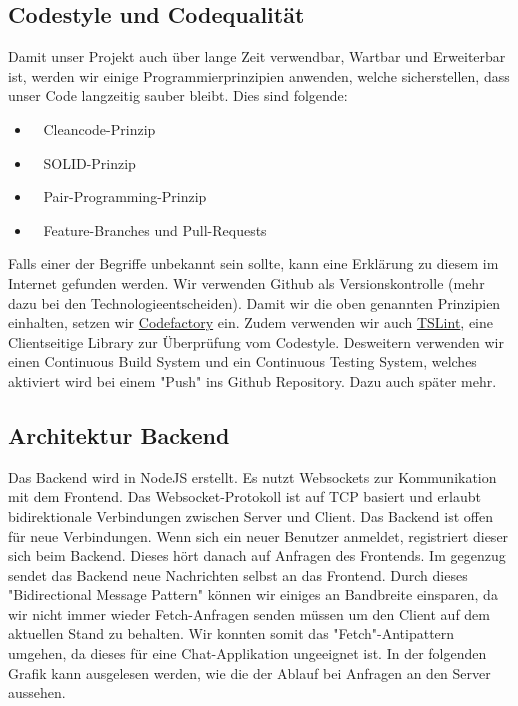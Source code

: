 	\subsection{Codestyle und Codequalität}
	Damit unser Projekt auch über lange Zeit verwendbar, Wartbar und Erweiterbar ist, werden wir einige Programmierprinzipien anwenden, welche sicherstellen, dass unser Code langzeitig sauber bleibt. Dies sind folgende:
	\begin{itemize}
		\item \faCode~ Cleancode-Prinzip
		\item \faInstitution~ SOLID-Prinzip
		\item \faUsers~ Pair-Programming-Prinzip
		\item \faGit~ Feature-Branches und Pull-Requests
	\end{itemize}
	Falls einer der Begriffe unbekannt sein sollte, kann eine Erklärung zu diesem im Internet gefunden werden.\newline
	Wir verwenden Github als Versionskontrolle (mehr dazu bei den Technologieentscheiden). Damit wir die oben genannten Prinzipien einhalten, setzen wir \href{https://www.codefactor.io}{Codefactory} ein. Zudem verwenden wir auch \href{https://palantir.github.io/tslint/}{TSLint}, eine Clientseitige Library zur Überprüfung vom Codestyle.\newline
	Desweitern verwenden wir einen Continuous Build System und ein Continuous Testing System, welches aktiviert wird bei einem "Push" ins Github Repository. Dazu auch später mehr.

	\subsection{Architektur Backend}
	Das Backend wird in NodeJS erstellt. Es nutzt Websockets zur Kommunikation mit dem Frontend. Das Websocket-Protokoll ist auf TCP basiert und erlaubt bidirektionale Verbindungen zwischen Server und Client. Das Backend ist offen für neue Verbindungen. Wenn sich ein neuer Benutzer anmeldet, registriert dieser sich beim Backend. Dieses hört danach auf Anfragen des Frontends. Im gegenzug sendet das Backend neue Nachrichten selbst an das Frontend. Durch dieses "Bidirectional Message Pattern" können wir einiges an Bandbreite einsparen, da wir nicht immer wieder Fetch-Anfragen senden müssen um den Client auf dem aktuellen Stand zu behalten. Wir konnten somit das "Fetch"-Antipattern umgehen, da dieses für eine Chat-Applikation ungeeignet ist. In der folgenden Grafik kann ausgelesen werden, wie die der Ablauf bei Anfragen an den Server aussehen.

